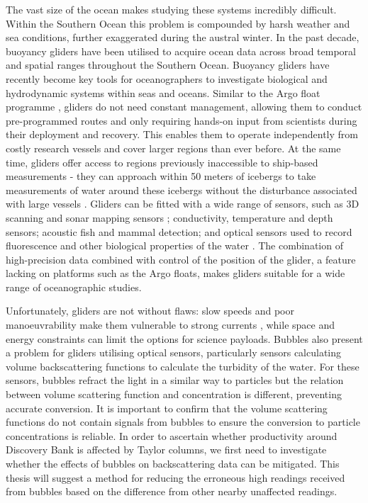 \documentclass[
	a4paper, %
	10pt, %
	unnumberedsections, %
	twoside, %
]{LTJournalArticle}
\begin{document}
\begin{multicols}{2}
The vast size of the ocean makes studying these systems incredibly difficult. Within the Southern Ocean this problem is compounded
by harsh weather and sea conditions, further exaggerated during the austral winter. In the past decade, buoyancy gliders have been
utilised to acquire ocean data across broad temporal and spatial ranges throughout the Southern Ocean. Buoyancy gliders have
recently become key tools for oceanographers to investigate biological and hydrodynamic systems within seas and oceans. Similar
to the Argo float programme \citep{ref59}, gliders do not need constant management, allowing them to conduct pre-programmed
routes and only requiring hands-on input from scientists during their deployment and recovery. This enables them to operate
independently from costly research vessels and cover larger regions than ever before. At the same time, gliders offer access
to regions previously inaccessible to ship-based measurements - they can approach within 50 meters of icebergs to take measurements
of water around these icebergs without the disturbance associated with large vessels \citep{ref48}. Gliders can be fitted with a
wide range of sensors, such as 3D scanning and sonar mapping sensors \citep{ref48, ref53}; conductivity, temperature and
depth sensors; acoustic fish and mammal detection; and optical sensors used to record fluorescence and other biological
properties of the water \citep{ref54, ref2}. The combination of high-precision data combined with control of the position of
the glider, a feature lacking on platforms such as the Argo floats, makes gliders suitable for a wide range of oceanographic
studies. 

Unfortunately, gliders are not without flaws: slow speeds and poor manoeuvrability make them vulnerable to strong currents
\citep{ref49}, while space and energy constraints can limit the options for science payloads. Bubbles also present a
problem for gliders utilising optical sensors, particularly sensors calculating volume backscattering functions to
calculate the turbidity of the water. For these sensors, bubbles refract the light in a similar way to particles but
the relation between volume scattering function and concentration is different, preventing accurate conversion. It is
important to confirm that the volume scattering functions do not contain signals from bubbles to ensure the conversion
to particle concentrations is reliable. In order to ascertain whether productivity around Discovery Bank is affected by
Taylor columns, we first need to investigate whether the effects of bubbles on backscattering data can be mitigated.
This thesis will suggest a method for reducing the erroneous high readings received from bubbles based on the difference
from other nearby unaffected readings.



\end{multicols}
\end{document}
